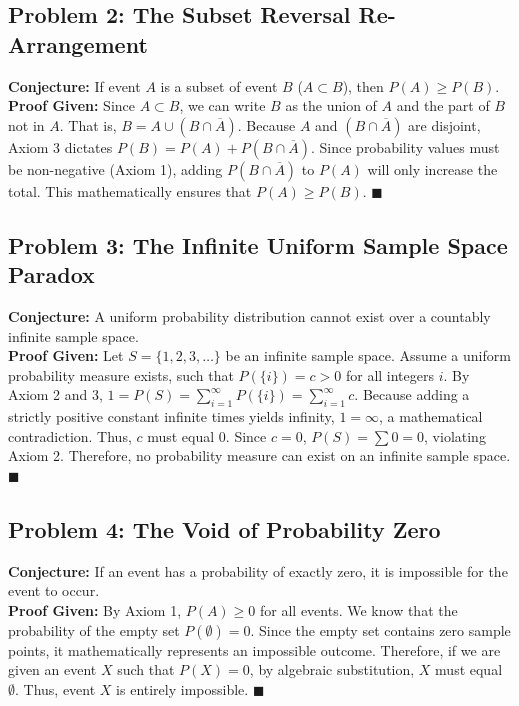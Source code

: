 \documentclass[12pt]{article}
\begin{document}
\subsection*{Problem 2: The Subset Reversal Re-Arrangement}
\textbf{Conjecture:} If event $A$ is a subset of event $B$ ($A \subset B$), then $P(A) \geq P(B)$. \\
\textbf{Proof Given:} Since $A \subset B$, we can write $B$ as the union of $A$ and the part of $B$ not in $A$. That is, $B = A \cup (B \cap \overline{A})$. Because $A$ and $(B \cap \overline{A})$ are disjoint, Axiom 3 dictates $P(B) = P(A) + P(B \cap \overline{A})$. Since probability values must be non-negative (Axiom 1), adding $P(B \cap \overline{A})$ to $P(A)$ will only increase the total. This mathematically ensures that $P(A) \geq P(B)$. $\blacksquare$

\subsection*{Problem 3: The Infinite Uniform Sample Space Paradox}
\textbf{Conjecture:} A uniform probability distribution cannot exist over a countably infinite sample space. \\
\textbf{Proof Given:} Let $S = \{1, 2, 3, \dots \}$ be an infinite sample space. Assume a uniform probability measure exists, such that $P(\{i\}) = c > 0$ for all integers $i$. By Axiom 2 and 3, $1 = P(S) = \sum_{i=1}^\infty P(\{i\}) = \sum_{i=1}^\infty c$. Because adding a strictly positive constant infinite times yields infinity, $1 = \infty$, a mathematical contradiction. Thus, $c$ must equal $0$. Since $c=0$, $P(S) = \sum 0 = 0$, violating Axiom 2. Therefore, no probability measure can exist on an infinite sample space. $\blacksquare$

\subsection*{Problem 4: The Void of Probability Zero}
\textbf{Conjecture:} If an event has a probability of exactly zero, it is impossible for the event to occur. \\
\textbf{Proof Given:} By Axiom 1, $P(A) \geq 0$ for all events. We know that the probability of the empty set $P(\emptyset) = 0$. Since the empty set contains zero sample points, it mathematically represents an impossible outcome. Therefore, if we are given an event $X$ such that $P(X) = 0$, by algebraic substitution, $X$ must equal $\emptyset$. Thus, event $X$ is entirely impossible. $\blacksquare$
\end{document}
